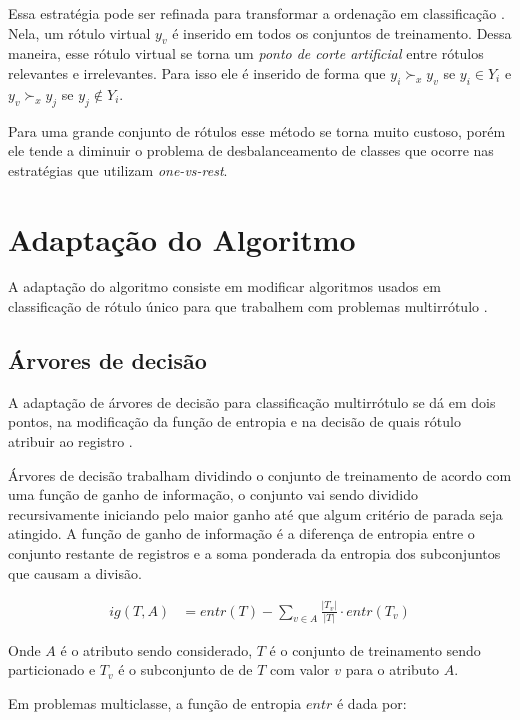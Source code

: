 \documentclass[runningheads,a4paper]{llncs}
\begin{document}
Essa estratégia pode ser refinada para transformar a ordenação em classificação \cite{Furnkranz2008-rf}. Nela, um rótulo virtual $y_v$ é inserido em todos os conjuntos de treinamento. Dessa maneira, esse rótulo virtual se torna um \textit{ponto de corte artificial} entre rótulos relevantes e irrelevantes. Para isso ele é inserido de forma que $y_i \succ_x y_v$ se $y_i \in Y_i$ e $y_v \succ_x y_j$ se $y_j \notin Y_i$.

Para uma grande conjunto de rótulos esse método se torna muito custoso, porém ele tende a diminuir o problema de desbalanceamento de classes que ocorre nas estratégias que utilizam \textit{one-vs-rest}.


\section{Adaptação do Algoritmo}\label{sec:adaptacao}

A adaptação do algoritmo consiste em modificar algoritmos usados em classificação de rótulo único para que trabalhem com problemas multirrótulo \cite{Tsoumakas2007-cw}.

\subsection{Árvores de decisão}

A adaptação de árvores de decisão para classificação multirrótulo se dá em dois pontos, na modificação da função de entropia e na decisão de quais rótulo atribuir ao registro \cite{Clare2001-tq}.

Árvores de decisão trabalham dividindo o conjunto de treinamento de acordo com uma função de ganho de informação, o conjunto vai sendo dividido recursivamente iniciando pelo maior ganho até que algum critério de parada seja atingido. A função de ganho de informação é a diferença de entropia entre o conjunto restante de registros e a soma ponderada da entropia dos subconjuntos que causam a divisão.

\begin{align*}
	ig(T, A) &= entr(T) - \sum_{v \in A} \frac{|T_v|}{|T|} \cdot entr(T_v)
\end{align*}

Onde $A$ é o atributo sendo considerado, $T$ é o conjunto de treinamento sendo particionado e $T_v$ é o subconjunto de de $T$ com valor $v$ para o atributo $A$.

Em problemas multiclasse, a função de entropia $entr$ é dada por:
\end{document}
